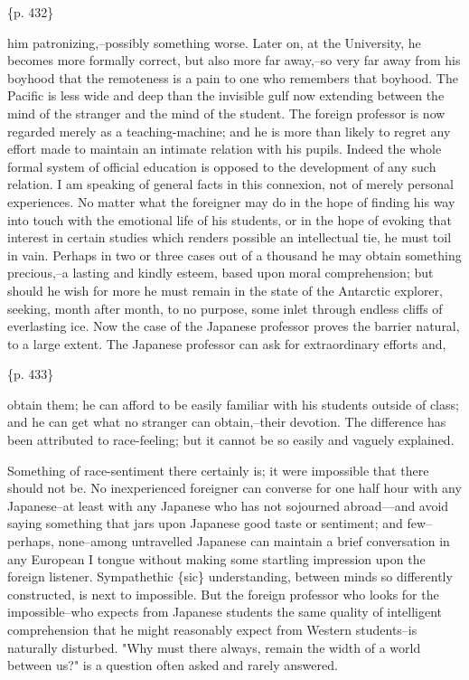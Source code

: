 \{p. 432\}

him patronizing,--possibly something worse. Later on, at the University, he becomes more formally correct, but also more far away,--so very far away from his boyhood that the remoteness is a pain to one who remembers that boyhood. The Pacific is less wide and deep than the invisible gulf now extending between the mind of the stranger and the mind of the student. The foreign professor is now regarded merely as a teaching-machine; and he is more than likely to regret any effort made to maintain an intimate relation with his pupils. Indeed the whole formal system of official education is opposed to the development of any such relation. I am speaking of general facts in this connexion, not of merely personal experiences. No matter what the foreigner may do in the hope of finding his way into touch with the emotional life of his students, or in the hope of evoking that interest in certain studies which renders possible an intellectual tie, he must toil in vain. Perhaps in two or three cases out of a thousand he may obtain something precious,--a lasting and kindly esteem, based upon moral comprehension; but should he wish for more he must remain in the state of the Antarctic explorer, seeking, month after month, to no purpose, some inlet through endless cliffs of everlasting ice. Now the case of the Japanese professor proves the barrier natural, to a large extent. The Japanese professor can ask for extraordinary efforts and,

\{p. 433\}

obtain them; he can afford to be easily familiar with his students outside of class; and he can get what no stranger can obtain,--their devotion. The difference has been attributed to race-feeling; but it cannot be so easily and vaguely explained.

Something of race-sentiment there certainly is; it were impossible that there should not be. No inexperienced foreigner can converse for one half hour with any Japanese--at least with any Japanese who has not sojourned abroad---and avoid saying something that jars upon Japanese good taste or sentiment; and few--perhaps, none--among untravelled Japanese can maintain a brief conversation in any European I tongue without making some startling impression upon the foreign listener. Sympathethic \{sic\} understanding, between minds so differently constructed, is next to impossible. But the foreign professor who looks for the impossible--who expects from Japanese students the same quality of intelligent comprehension that he might reasonably expect from Western students--is naturally disturbed. "Why must there always, remain the width of a world between us?" is a question often asked and rarely answered.



